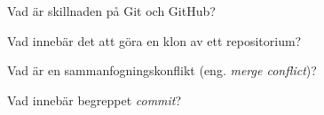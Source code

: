 \item Vad är skillnaden på Git och GitHub?
\qskip
\item Vad innebär det att göra en klon av ett repositorium?
\qskip
\item Vad är en sammanfogningskonflikt (eng. \emph{merge conflict})?
\qskip
\item Vad innebär begreppet \emph{commit}?
